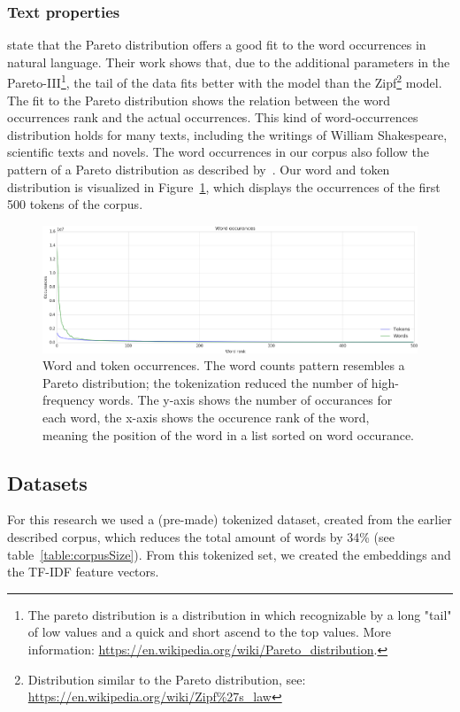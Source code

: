 \documentclass[../../Thesis.tex]{subfiles}
\begin{document}
\subsubsection{Text properties}
\citet{wiegand2018word} state that the Pareto distribution offers a good fit to the word occurrences in natural language. Their work shows that, due to the additional parameters in the Pareto-III\footnote{The pareto distribution is a distribution in which recognizable by a long "tail" of low values and a quick and short ascend to the top values. More information: \url{https://en.wikipedia.org/wiki/Pareto_distribution}.}, the tail of the data fits better with the model than the Zipf\footnote{Distribution similar to the Pareto distribution, see: \url{https://en.wikipedia.org/wiki/Zipf\%27s_law}} model. The fit to the Pareto distribution shows the relation between the word occurrences rank and the actual occurrences. This kind of word-occurrences distribution holds for many texts, including the writings of William Shakespeare, scientific texts and novels\cite{thurner2015understanding}.
The word occurrences in our corpus also follow the pattern of a Pareto distribution as described by~\citet{wiegand2018word}. Our word and token distribution is visualized in Figure~\ref{figure:wordTokenOccurrence}, which displays the occurrences of the first 500 tokens of the corpus.
\FloatBarrier
\begin{figure}[hbt]
\includegraphics[width=6.5in]{Plots/word_occurrences}
\caption{Word and token occurrences. The word counts pattern resembles a Pareto distribution; the tokenization reduced the number of high-frequency words. The y-axis shows the number of occurances for each word, the x-axis shows the occurence rank of the word, meaning the position of the word in a list sorted on word occurance.}\label{figure:wordTokenOccurrence}
\end{figure}
\FloatBarrier
\subsection{Datasets}
For this research we used a (pre-made) tokenized dataset, created from the earlier described corpus, which reduces the total amount of words by 34\% (see table~\ref{table:corpusSize}). From this tokenized set, we created the embeddings and the TF-IDF feature vectors.
\end{document}
